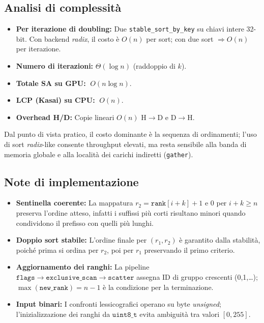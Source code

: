 		\subsection{Analisi di complessità}
			\begin{itemize}
				\item \textbf{Per iterazione di doubling:} Due \texttt{stable\_sort\_by\_key} su chiavi intere 32-bit.
				Con backend \emph{radix}, il costo è $O(n)$ per sort; con due sort \(\Rightarrow O(n)\) per iterazione.
				\item \textbf{Numero di iterazioni:} \(\Theta(\log n)\) (raddoppio di \(k\)).
				\item \textbf{Totale SA su GPU:} \(\;O(n \log n)\).
				\item \textbf{LCP (Kasai) su CPU:} \(\;O(n)\).
				\item \textbf{Overhead H/D:} Copie lineari \(O(n)\) H\(\to\)D e D\(\to\)H\@.
			\end{itemize}
			Dal punto di vista pratico, il costo dominante è la sequenza di ordinamenti; l’uso di sort \emph{radix}-like consente throughput elevati, ma resta sensibile alla banda di memoria globale e alla località dei carichi indiretti (\texttt{gather}).
		
		\subsection{Note di implementazione}
			\begin{itemize}
				\item \textbf{Sentinella coerente:} La mappatura \(r_2 = \texttt{rank}[i{+}k]{+}1\) e \(0\) per \(i{+}k \ge n\) preserva l'ordine atteso, infatti i suffissi più corti risultano minori quando condividono il prefisso con quelli più lunghi.
				\item \textbf{Doppio sort stabile:} L'ordine finale per \((r_1,r_2)\) è garantito dalla stabilità, poiché prima si ordina per \(r_2\), poi per \(r_1\) preservando il primo criterio.
				\item \textbf{Aggiornamento dei ranghi:} La pipeline \(\texttt{flags}\rightarrow\texttt{exclusive\_scan}\rightarrow\texttt{scatter}\) assegna ID di gruppo crescenti (0,1,\dots); \(\max(\texttt{new\_rank}){=}n{-}1\) è la condizione per la terminazione.
				\item \textbf{Input binari:} I confronti lessicografici operano su byte \textit{unsigned}; l’inizializzazione dei ranghi da \(\texttt{uint8\_t}\) evita ambiguità tra valori \([0,255]\).
			\end{itemize}
		
